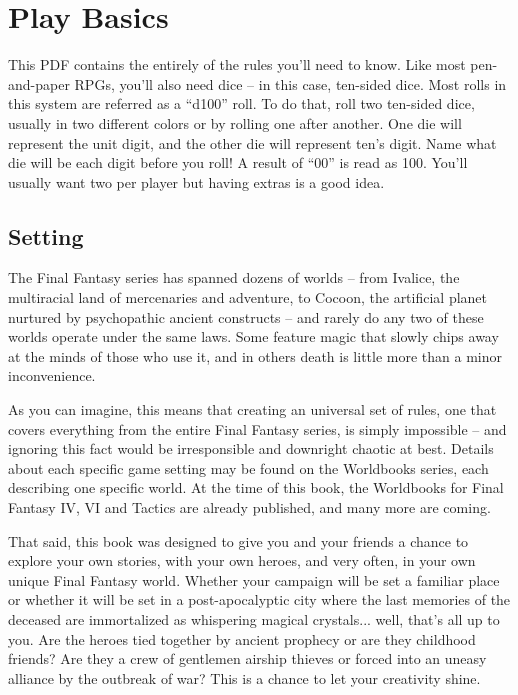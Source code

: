 \section{Play Basics}
This PDF contains the entirely of the rules
you'll need to know. Like most pen-and-paper
RPGs, you'll also need dice – in this case, ten-sided
dice. Most rolls in this system are referred as a
“d100” roll. To do that, roll two ten-sided dice,
usually in two different colors or by rolling one
after another. One die will represent the unit digit,
and the other die will represent ten's digit. Name
what die will be each digit before you roll! A result
of “00” is read as 100. You’ll usually want two per
player but having extras is a good idea.

\subsection{Setting}
The Final Fantasy series has spanned
dozens of worlds – from Ivalice, the multiracial
land of mercenaries and adventure, to Cocoon, the
artificial planet nurtured by psychopathic ancient
constructs – and rarely do any two of these worlds
operate under the same laws. Some feature magic
that slowly chips away at the minds of those who
use it, and in others death is little more than a
minor inconvenience.

As you can imagine, this means that creating
an universal set of rules, one that covers
everything from the entire Final Fantasy series, is
simply impossible – and ignoring this fact would
be irresponsible and downright chaotic at best.
Details about each specific game setting may be
found on the Worldbooks series, each describing
one specific world. At the time of this book, the
Worldbooks for Final Fantasy IV, VI and Tactics are
already published, and many more are coming.

That said, this book was designed to give you
and your friends a chance to explore your own
stories, with your own heroes, and very often, in
your own unique Final Fantasy world. Whether
your campaign will be set a familiar place or
whether it will be set in a post-apocalyptic city
where the last memories of the deceased are
immortalized as whispering magical crystals...
well, that’s all up to you. Are the heroes tied
together by ancient prophecy or are they
childhood friends? Are they a crew of gentlemen
airship thieves or forced into an uneasy alliance by
the outbreak of war? This is a chance to let your
creativity shine.

